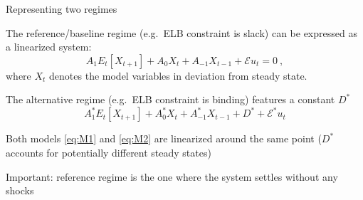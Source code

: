 \begin{frame}{Representing two regimes}
\begin{wideitemize}
\item The reference/baseline regime (e.g.\ ELB constraint is slack) can be expressed as a linearized system:
\begin{equation}\label{eq:M1}
A_1E_t\left[X_{t+1}\right] + A_0X_t  + A_{-1}X_{t-1} +  \mathcal{E} u_t = 0 \: , \tag{M1}
\end{equation}
where $X_t$ denotes the model variables in deviation from steady state.
\item The alternative regime (e.g.\ ELB constraint is binding) features a constant $D^{\ast}$
\begin{equation}\label{eq:M2}
A_1^{\ast}E_t\left[X_{t+1}\right] + A_0^{\ast}X_t  + A_{-1}^{\ast}X_{t-1} + D^{\ast}+ \mathcal{E}^{\ast} u_t \tag{M2}
\end{equation}
\item Both models \ref{eq:M1} and \ref{eq:M2} are linearized around the same point ($D^*$ accounts for potentially different steady states)
\item Important: reference regime is the one where the system settles without any shocks
\end{wideitemize}
\end{frame}

